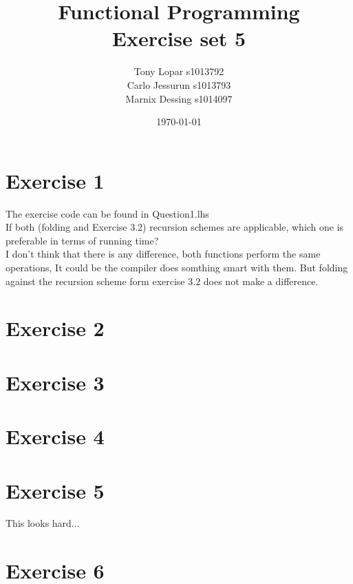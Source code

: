 \documentclass{article}
\begin{document}
\title{Functional Programming \\ Exercise set 5}
\date{\today}
\author{Tony Lopar s1013792 \\ Carlo Jessurun s1013793 \\ Marnix Dessing s1014097}
\maketitle

\section*{Exercise 1}
The exercise code can be found in Question1.lhs\\
If both (folding and Exercise 3.2) recursion schemes are applicable, 
which one is preferable in terms of running time?\\
I don't think that there is any difference, both functions perform the same operations,
It could be the compiler does somthing smart with them. But folding against the 
recursion scheme form exercise 3.2 does not make a difference.

\section*{Exercise 2}
\section*{Exercise 3}
\section*{Exercise 4}
\section*{Exercise 5}
This looks hard...
\section*{Exercise 6}
\end{document}
